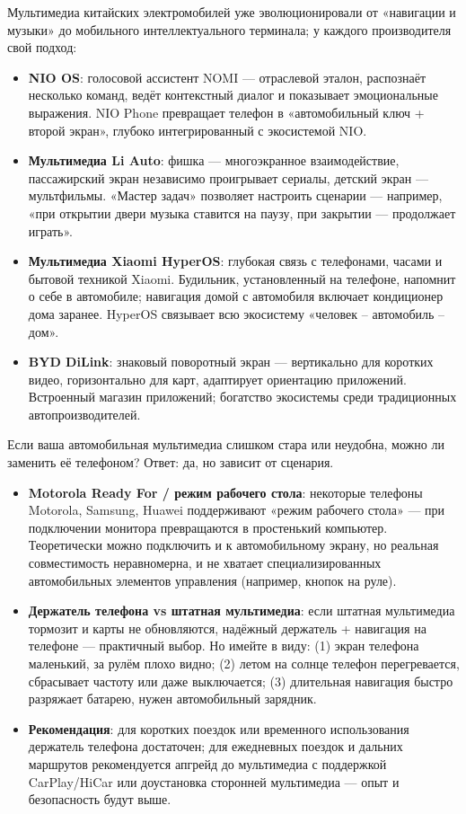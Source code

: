 
Мультимедиа китайских электромобилей уже эволюционировали от «навигации и музыки» до мобильного интеллектуального терминала; у каждого производителя свой подход:

\begin{itemize}
  \item \textbf{NIO OS}: голосовой ассистент NOMI — отраслевой эталон, распознаёт несколько команд, ведёт контекстный диалог и показывает эмоциональные выражения. NIO Phone превращает телефон в «автомобильный ключ + второй экран», глубоко интегрированный с экосистемой NIO.
  \item \textbf{Мультимедиа Li Auto}: фишка — многоэкранное взаимодействие, пассажирский экран независимо проигрывает сериалы, детский экран — мультфильмы. «Мастер задач» позволяет настроить сценарии — например, «при открытии двери музыка ставится на паузу, при закрытии — продолжает играть».
  \item \textbf{Мультимедиа Xiaomi HyperOS}: глубокая связь с телефонами, часами и бытовой техникой Xiaomi. Будильник, установленный на телефоне, напомнит о себе в автомобиле; навигация домой с автомобиля включает кондиционер дома заранее. HyperOS связывает всю экосистему «человек – автомобиль – дом».
  \item \textbf{BYD DiLink}: знаковый поворотный экран — вертикально для коротких видео, горизонтально для карт, адаптирует ориентацию приложений. Встроенный магазин приложений; богатство экосистемы среди традиционных автопроизводителей.
\end{itemize}


Если ваша автомобильная мультимедиа слишком стара или неудобна, можно ли заменить её телефоном? Ответ: да, но зависит от сценария.

\begin{itemize}
  \item \textbf{Motorola Ready For / режим рабочего стола}: некоторые телефоны Motorola, Samsung, Huawei поддерживают «режим рабочего стола» — при подключении монитора превращаются в простенький компьютер. Теоретически можно подключить и к автомобильному экрану, но реальная совместимость неравномерна, и не хватает специализированных автомобильных элементов управления (например, кнопок на руле).
  \item \textbf{Держатель телефона vs штатная мультимедиа}: если штатная мультимедиа тормозит и карты не обновляются, надёжный держатель + навигация на телефоне — практичный выбор. Но имейте в виду: (1) экран телефона маленький, за рулём плохо видно; (2) летом на солнце телефон перегревается, сбрасывает частоту или даже выключается; (3) длительная навигация быстро разряжает батарею, нужен автомобильный зарядник.
  \item \textbf{Рекомендация}: для коротких поездок или временного использования держатель телефона достаточен; для ежедневных поездок и дальних маршрутов рекомендуется апгрейд до мультимедиа с поддержкой CarPlay/HiCar или доустановка сторонней мультимедиа — опыт и безопасность будут выше.
\end{itemize}

